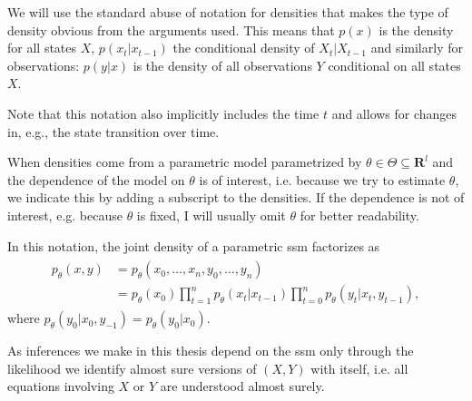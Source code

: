 \begin{notation}
    \label{not:densities}
    We will use the standard abuse of notation for densities that makes the type of density \glqq{}obvious\grqq{} from the arguments used.
    This means that $p(x)$ is the density for all states $X$, $p(x_t|x_{t - 1})$ the conditional density of $X_t|X_{t - 1}$ and similarly for observations: $p(y|x)$ is the density of all observations $Y$ conditional on all states $X$.

    Note that this notation also implicitly includes the time $t$ and allows for changes in, e.g., the state transition over time.

    When densities come from a parametric model parametrized by $\theta \in \Theta \subseteq \mathbf{R}^{l}$ and the dependence of the model on $\theta$ is of interest, i.e. because we try to estimate $\theta$, we indicate this by adding a subscript to the densities.
    If the dependence is not of interest, e.g. because $\theta$ is fixed, I will usually omit $\theta$ for better readability.

    In this notation, the joint density of a parametric \gls{ssm} factorizes as
    \begin{align}
        \label{eq:joint_density}
        \begin{split}
        p_\theta(x,y) & = p_\theta(x_0, \dots, x_{n}, y_0, \dots, y_{n})                                                              \\
                      & = p_\theta (x_0)\prod_{t = 1}^{n} p_\theta(x_{t}|x_{t - 1}) \prod_{t = 0}^{n} p_\theta(y_t | x_t, y_{t - 1}),
        \end{split}
    \end{align}
    where $p_\theta(y_0|x_0, y_{-1}) = p_\theta(y_0| x_0)$.

    As inferences we make in this thesis depend on the \gls{ssm} only through the likelihood we identify almost sure versions of $(X, Y)$ with itself, i.e. all equations involving $X$ or $Y$ are understood almost surely.
\end{notation}

